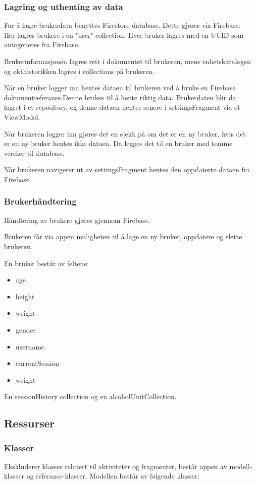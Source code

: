 \subsubsection{Lagring og uthenting av data}
For å lagre brukerdata benyttes Firestore database. Dette gjøres via Firebase. Her lagres brukere i en "user" collection. Hver bruker lagres med en UUID som autogeneres fra Firebase. 

Brukerinformasjonen lagres rett i dokumentet til brukeren, mens enhetskatalogen og økthistorikken lagres i collections på brukeren. 

Når en bruker logger inn hentes dataen til brukeren ved å bruke en Firebase dokumentreferanse.Denne brukes til å hente riktig data. Brukerdaten blir da lagret i et repository, og denne dataen hentes senere i settingsFragment via et ViewModel. 

Når brukeren logger inn gjøres det en sjekk på om det er en ny bruker, hvis det er en ny bruker hentes ikke dataen. 
Da legges det til en bruker med tomme verdier til database. 

Når brukeren navigerer ut av settingsFragment hentes den oppdaterte dataen fra Firebase.

\subsubsection{Brukerhåndtering}
Håndtering av brukere gjøres gjennom Firebase.

Brukeren får via appen muligheten til å lage en ny bruker, oppdatere og slette brukeren.

En bruker består av feltene:
\begin{itemize}
    \item age
    \item height
    \item weight
    \item gender
    \item username
    \item currentSession
    \item weight
\end{itemize}

En sessionHistory collection og en alcoholUnitCollection.

\subsection{Ressurser}

\subsubsection{Klasser}
Ekskluderer klasser relatert til aktiviteter og fragmenter, består appen av modell-klasser og referanse-klasser. Modellen består av følgende klasser:

